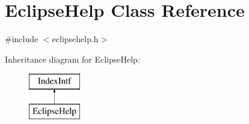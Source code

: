 \hypertarget{class_eclipse_help}{}\section{Eclipse\+Help Class Reference}
\label{class_eclipse_help}


{\ttfamily \#include $<$eclipsehelp.\+h$>$}

Inheritance diagram for Eclipse\+Help\+:\begin{figure}[H]
\begin{center}
\leavevmode
\includegraphics[height=2.000000cm]{class_eclipse_help}
\end{center}
\end{figure}
